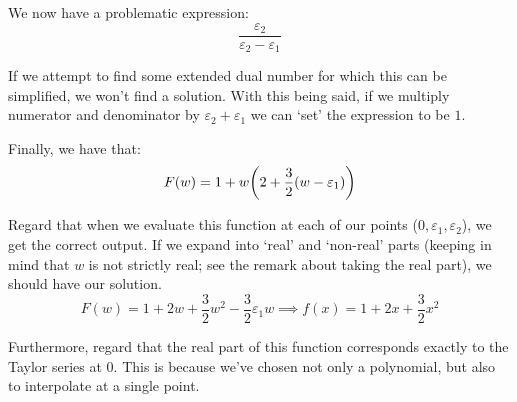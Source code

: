 \begin{example}
    We now have a problematic expression:
    $$
        \frac{\varepsilon_2}{\varepsilon_2-\varepsilon_1}
    $$

    If we attempt to find some extended dual number for which this can be simplified, we won't find a solution. With this being said, if we multiply numerator and denominator by $\varepsilon_2+\varepsilon_1$ we can `set' the expression to be $1$.

    Finally, we have that:
    $$
        F(w) = 1+w\paren*{2+\frac{3}{2}(w-\varepsilon_1)}
    $$

    Regard that when we evaluate this function at each of our points ($0,\varepsilon_1,\varepsilon_2$), we get the correct output. If we expand into `real' and `non-real' parts (keeping in mind that $w$ is not strictly real; see the remark about taking the real part), we should have our solution.
    $$
        F(w) = 1+2w+\frac{3}{2}w^2-\frac{3}{2}\varepsilon_1w \implies f(x)=1+2x+\frac{3}{2}x^2
    $$

    Furthermore, regard that the real part of this function corresponds exactly to the Taylor series at $0$. This is because we've chosen not only a polynomial, but also to interpolate at a single point.
\end{example}

